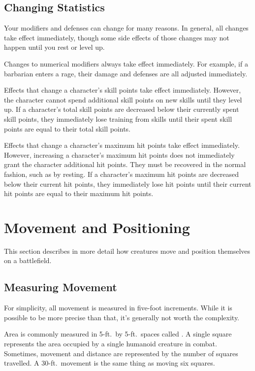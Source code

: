     \subsection{Changing Statistics}

        Your modifiers and defenses can change for many reasons.
        In general, all changes take effect immediately, though some side effects of those changes may not happen until you rest or level up.

         Changes to numerical modifiers always take effect immediately.
        For example, if a barbarian enters a rage, their damage and defenses are all adjusted immediately.

         Effects that change a character's skill points take effect immediately.
        However, the character cannot spend additional skill points on new skills until they level up.
        If a character's total skill points are decreased below their currently spent skill points, they immediately lose training from skills until their spent skill points are equal to their total skill points.

         Effects that change a character's maximum hit points take effect immediately.
        However, increasing a character's maximum hit points does not immediately grant the character additional hit points.
        They must be recovered in the normal fashion, such as by resting.
        If a character's maximum hit points are decreased below their current hit points, they immediately lose hit points until their current hit points are equal to their maximum hit points.

\section{Movement and Positioning}\label{Movement and Positioning}

    This section describes in more detail how creatures move and position themselves on a battlefield.

    \subsection{Measuring Movement}

        For simplicity, all movement is measured in five-foot increments.
        While it is possible to be more precise than that, it's generally not worth the complexity.

        \label{Squares} Area is commonly measured in 5-ft.\ by 5-ft.\ spaces called .
        A single square represents the area occupied by a single humanoid creature in combat.
        Sometimes, movement and distance are represented by the number of squares travelled.
        A 30-ft.\ movement is the same thing as moving six squares.

